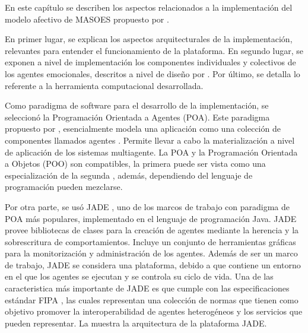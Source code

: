 %
%
%


En este capítulo se describen los aspectos relacionados a la implementación
del modelo afectivo de MASOES propuesto por \cite{perozo2011}.

En primer lugar, se explican los aspectos arquitecturales de la implementación,
relevantes para entender el funcionamiento de la plataforma.
En segundo lugar, se exponen a nivel de implementación los componentes individuales y
colectivos de los agentes emocionales, descritos a nivel de diseño por \cite{perozo2011}.
Por último, se detalla lo referente a la herramienta computacional desarrollada.


Como paradigma de software para el desarrollo de la implementación,
se seleccionó la Programación Orientada a Agentes (POA). Este paradigma propuesto
por \cite{shoham1993agent}, esencialmente modela una aplicación como una
colección de componentes llamados agentes \citep{bellifemine2007developing}.
Permite llevar a cabo la materialización a nivel de aplicación de los sistemas
multiagente.
La POA y la Programación Orientada a Objetos (POO) son
compatibles, la primera puede ser vista como una especialización de la segunda \citep{shoham1993agent},
además, dependiendo del lenguaje de programación pueden mezclarse.

Por otra parte, se usó JADE , uno de los marcos de trabajo con paradigma de POA
más populares, implementado en el lenguaje de programación Java.
JADE provee bibliotecas de clases para la creación de agentes mediante
la herencia y la sobrescritura de comportamientos. Incluye
un conjunto de herramientas gráficas para la monitorización y administración de los agentes.
Además de ser un marco de trabajo, JADE se considera una plataforma,
debido a que contiene un entorno en el que los agentes se ejecutan
y se controla su ciclo de vida. Una de las caracteristica más importante de JADE
es que cumple con las especificaciones estándar FIPA ,
las cuales representan una colección de normas que tienen como objetivo promover la interoperabilidad
de agentes heterogéneos y los servicios que pueden representar. La 
muestra la arquitectura de la plataforma JADE.


